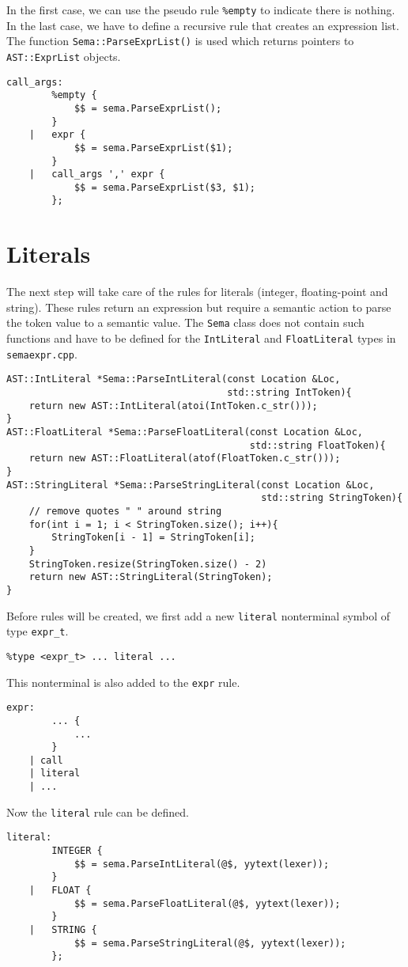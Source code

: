 \documentclass{report}
\begin{document}
In the first case, we can use the pseudo rule \texttt{\%empty} to indicate there is nothing. In the last case, we have to define a recursive rule that creates an expression list.  The function \texttt{Sema::ParseExprList()} is used which returns pointers to \texttt{AST::ExprList} objects.
\begin{lstlisting}
call_args:
		%empty {
			$$ = sema.ParseExprList();
		}
	|	expr {
			$$ = sema.ParseExprList($1);
		}
	|   call_args ',' expr {
			$$ = sema.ParseExprList($3, $1);
		};
\end{lstlisting}

	\section{Literals}
	The next step will take care of the rules for literals (integer, floating-point and string). These rules return an expression but require a semantic action to parse the token value to a semantic value. The \texttt{Sema} class does not contain such functions and have to be defined for the \texttt{IntLiteral} and \texttt{FloatLiteral} types in \texttt{semaexpr.cpp}.
	\begin{lstlisting}
AST::IntLiteral *Sema::ParseIntLiteral(const Location &Loc,
                                       std::string IntToken){
	return new AST::IntLiteral(atoi(IntToken.c_str()));
}
AST::FloatLiteral *Sema::ParseFloatLiteral(const Location &Loc,
                                           std::string FloatToken){
	return new AST::FloatLiteral(atof(FloatToken.c_str()));
}
AST::StringLiteral *Sema::ParseStringLiteral(const Location &Loc,
                                             std::string StringToken){
	// remove quotes " " around string
	for(int i = 1; i < StringToken.size(); i++){
		StringToken[i - 1] = StringToken[i];
	}										
	StringToken.resize(StringToken.size() - 2)
	return new AST::StringLiteral(StringToken); 
}
	\end{lstlisting}
Before rules will be created, we first add a new \texttt{literal} nonterminal symbol of type \texttt{expr\_t}.
\begin{lstlisting}
%type <expr_t> ... literal ...
\end{lstlisting}
This nonterminal is also added to the \texttt{expr} rule.
\begin{lstlisting}
expr:
		... {
			...
		}
	| call
	| literal
	| ...
\end{lstlisting}

Now the \texttt{literal} rule can be defined.
\begin{lstlisting}
literal:
		INTEGER {
			$$ = sema.ParseIntLiteral(@$, yytext(lexer));
		}
	|   FLOAT {
			$$ = sema.ParseFloatLiteral(@$, yytext(lexer));
		}
	|	STRING {
			$$ = sema.ParseStringLiteral(@$, yytext(lexer));
		};
\end{lstlisting}
\end{document}
